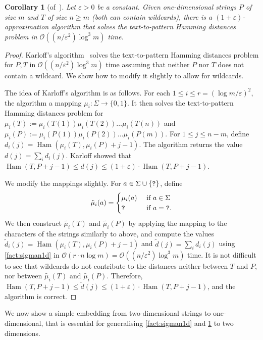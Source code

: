 \documentclass[11pt, letterpaper]{article}
\theoremstyle{plain}
\newtheorem{corollary}[fact]{Corollary}
\theoremstyle{definition}
\theoremstyle{remark}
\renewcommand{\O}{\mathcal{O}}
\DeclareMathOperator*{\Ham}{Ham}
\begin{document}
\begin{corollary}[of~\cite{Karloff1993}]\label{cor:approx1d}
Let $\varepsilon > 0$ be a constant. Given one-dimensional strings $P$ of size $m$ and $T$ of size $n \ge m$ (both can contain wildcards), there is a $(1+\varepsilon)$-approximation algorithm that solves the text-to-pattern Hamming distances problem in $\O((n/\varepsilon^2)  \log^3 m)$ time.
\end{corollary}
\begin{proof}
Karloff's algorithm~\cite{Karloff1993} solves the text-to-pattern Hamming distances problem for $P,T$ in $\O((n/\varepsilon^2)  \log^3 m)$ time assuming that neither $P$ nor $T$ does not contain a wildcard. We show how to modify it slightly to allow for wildcards. 

The idea of Karloff's algorithm is as follows. For each $1 \le i \le r = (\log m/ \varepsilon)^2$, the algorithm a mapping $\mu_i : \Sigma \rightarrow \{0,1\}$. It then solves the text-to-pattern Hamming distances problem for $\mu_i(T) := \mu_i(T(1))\mu_i(T(2)) \ldots \mu_i(T(n))$ and $\mu_i(P) := \mu_i(P(1))\mu_i(P(2)) \ldots \mu_i(P(m))$. For $1 \le j \le n-m$, define $d_i(j) = \Ham(\mu_i(T), \mu_i(P)+j-1)$. The algorithm returns the value $d(j) = \sum_i d_i(j)$. Karloff showed that $\Ham(T, P+j-1) \le d(j) \le (1+\varepsilon) \cdot \Ham(T, P+j-1)$.

We modify the mappings slightly. For $a \in \Sigma \cup \{\texttt{?}\}$, define
$$
\tilde{\mu}_i(a) = 
\begin{cases}
\mu_i(a) &\text{ if } a \in \Sigma\\
\texttt{?} & \text{ if } a = \texttt{?}.
\end{cases}
$$
We then construct $\tilde{\mu_i}(T)$ and $\tilde{\mu_i}(P)$ by applying the mapping to the characters of the strings similarly to above, and compute the values $\tilde{d}_i(j) = \Ham(\mu_i(T), \mu_i(P)+j-1)$ and $\tilde{d}(j) = \sum_i d_i(j)$ using \cref{fact:sigman1d} in $\O(r \cdot n \log m) = \O((n/\varepsilon^2) \log^3 m)$ time. It is not difficult to see that wildcards do not contribute to the distances neither between $T$ and $P$, nor between $\tilde{\mu_i}(T)$ and $\tilde{\mu_i}(P)$. Therefore, $\Ham(T, P+j-1) \le \tilde{d}(j) \le (1+\varepsilon) \cdot \Ham(T, P+j-1)$, and the algorithm is correct. 
\end{proof}

We now show a simple embedding from two-dimensional strings to one-dimensional, that is essential for generalising \cref{fact:sigman1d} and \cref{cor:approx1d} to two dimensions.
\end{document}
